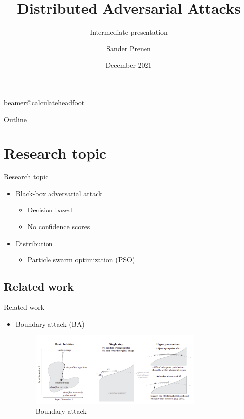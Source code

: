 \documentclass[11pt,t]{beamer}
\title[Distributed Adversarial Attacks]{Distributed Adversarial Attacks} %
\subtitle{Intermediate presentation}
\author{Sander Prenen}
\institute{KU Leuven}
\date{December 2021}
\begin{document}
\csname beamer@calculateheadfoot\endcsname %

\begin{frame}
	\titlepage
\end{frame}

\begin{frame}{Outline}
	\hfill	{\large \parbox{.961\textwidth}{\tableofcontents[hideothersubsections]}}
\end{frame}

\section{Research topic}
\begin{frame}{Research topic}
\begin{itemize}
	\item Black-box adversarial attack
	\begin{itemize}
		\item Decision based
		\item No confidence scores
	\end{itemize}

	\item Distribution
	\begin{itemize}
		\item Particle swarm optimization (PSO)
	\end{itemize}
\end{itemize}
\end{frame}

\subsection{Related work}
\begin{frame}{Related work}
\begin{itemize}
	\item Boundary attack (BA)
	\vspace{6pt}
	\begin{figure}
	\centering
	\includegraphics[width=0.8\textwidth]{graphics/boundary_attack.png}
	\caption{Boundary attack \cite{brendel2018decisionbased}\label{fig:boundary_attack}}
	\footnotesize
	\flushleft
	\end{figure}
\end{itemize}

\end{frame}
\end{document}
